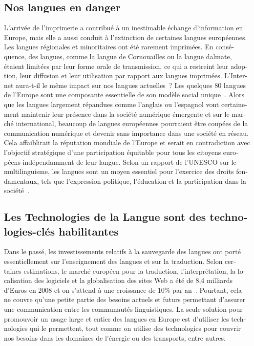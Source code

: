 \begin{french}
\begin{multicols}{2}
\subsection{Nos langues en danger}

L'arrivée de l'imprimerie a contribué à un inestimable
échange d'information en Europe, mais elle a aussi conduit à
l'extinction de certaines langues européennes. Les langues
régionales et minoritaires ont été rarement imprimées. En conséquence,
des langues, comme la langue de Cornouailles ou la langue dalmate,
étaient limitées par leur forme orale de transmission, ce qui a
restreint leur adoption, leur diffusion et leur utilisation par
rapport aux langues imprimées. L'Internet aura-t-il le même
impact sur nos langues actuelles~?
Les quelques 80 langues de l'Europe sont une composante
essentielle de son modèle social unique~\cite{EC2}. Alors que les
langues largement répandues comme l'anglais ou l'espagnol vont certainement maintenir leur présence dans la société
numérique émergente et sur le marché international, beaucoup de
langues européennes pourraient être coupées de la communication
numérique et devenir sans importance dans une société en réseau. Cela
affaiblirait la réputation mondiale de l'Europe et serait en
contradiction avec l'objectif stratégique d'une
participation équitable pour tous les citoyens européens
indépendamment de leur langue. Selon un rapport de l'UNESCO
sur le multilinguisme, les langues sont un moyen essentiel pour
l'exercice des droits fondamentaux, tels que l'expression
politique, l'éducation et la participation dans la
société~\cite{UNESCO2007}.

\subsection{Les Technologies de la Langue sont des technologies-clés habilitantes}

Dans le passé, les investissements relatifs à la sauvegarde des
langues ont porté essentiellement sur l'enseignement des
langues et sur la traduction. Selon certaines estimations, le marché
européen pour la traduction, l'interprétation, la localisation
des logiciels et la globalisation des sites Web a été de 8,4 milliards
d'Euros en 2008 et on s'attend à une croissance de
10\% par an~\cite{dgt08}. Pourtant, cela ne couvre qu'une petite
partie des besoins actuels et futurs permettant d'assurer une
communication entre les communautés linguistiques. La seule solution
pour promouvoir un usage large et entier des langues en Europe est
d'utiliser les technologies qui le permettent, tout comme on
utilise des technologies pour couvrir nos besoins dans les domaines de
l'énergie ou des transports, entre autres.


\end{multicols}
\end{french}
